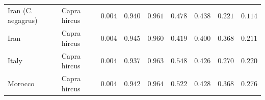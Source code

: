 \documentclass{article}
\providecommand{\DIFaddtex}[1]{{\protect\color{blue}\uwave{#1}}} %
\providecommand{\DIFdeltex}[1]{{\protect\color{red}\sout{#1}}}                      %
\providecommand{\DIFaddFL}[1]{\DIFadd{#1}} %
\providecommand{\DIFdelFL}[1]{\DIFdel{#1}} %
\providecommand{\DIFaddbeginFL}{} %
\providecommand{\DIFaddendFL}{} %
\providecommand{\DIFdelbeginFL}{} %
\providecommand{\DIFdelendFL}{} %
\providecommand{\DIFadd}[1]{\texorpdfstring{\DIFaddtex{#1}}{#1}} %
\providecommand{\DIFdel}[1]{\texorpdfstring{\DIFdeltex{#1}}{}} %
\newcommand{\DIFscaledelfig}{0.5}
\newlength{\DIFdelgraphicswidth} %
\newlength{\DIFdelgraphicsheight} %
\newcommand{\DIFaddincludegraphics}[2][]{{\color{blue}\fbox{\DIFOincludegraphics[#1]{#2}}}} %
\newcommand{\DIFdelincludegraphics}[2][]{%
\sbox{\DIFdelgraphicsbox}{\DIFOincludegraphics[#1]{#2}}%
\settoboxwidth{\DIFdelgraphicswidth}{\DIFdelgraphicsbox} %
\settoboxtotalheight{\DIFdelgraphicsheight}{\DIFdelgraphicsbox} %
\scalebox{\DIFscaledelfig}{%
\parbox[b]{\DIFdelgraphicswidth}{\usebox{\DIFdelgraphicsbox}\\[-\baselineskip] \rule{\DIFdelgraphicswidth}{0em}}\llap{\resizebox{\DIFdelgraphicswidth}{\DIFdelgraphicsheight}{%
\setlength{\unitlength}{\DIFdelgraphicswidth}%
\begin{picture}(1,1)%
\thicklines\linethickness{2pt} %
{\color[rgb]{1,0,0}\put(0,0){\framebox(1,1){}}}%
{\color[rgb]{1,0,0}\put(0,0){\line( 1,1){1}}}%
{\color[rgb]{1,0,0}\put(0,1){\line(1,-1){1}}}%
\end{picture}%
}\hspace*{3pt}}} %
} %
\DeclareRobustCommand{\DIFaddbeginFL}{\DIFOaddbeginFL \let\includegraphics\DIFaddincludegraphics} %
\DeclareRobustCommand{\DIFaddendFL}{\DIFOaddendFL \let\includegraphics\DIFOincludegraphics} %
\DeclareRobustCommand{\DIFdelbeginFL}{\DIFOdelbeginFL \let\includegraphics\DIFdelincludegraphics} %
\DeclareRobustCommand{\DIFdelendFL}{\DIFOaddendFL \let\includegraphics\DIFOincludegraphics} %
\begin{document}
\begin{table}[tb]
\begin{adjustbox}{width=\textwidth}
\begin{tabular}{||l|l|r||r|r||r|r||r|r||}
                \rowcolor{LIGHTGREY} Iran (C. aegagrus) & Capra hircus & \DIFdelbeginFL \DIFdelFL{$ 0.004$ }\DIFdelendFL \DIFaddbeginFL \DIFaddFL{$1.9\times 10^{5}$ }\DIFaddendFL & \DIFdelbeginFL \DIFdelFL{$ 0.940$ }\DIFdelendFL \DIFaddbeginFL \DIFaddFL{$ 0.948$ }\DIFaddendFL & \DIFdelbeginFL \DIFdelFL{$ 0.961$ }\DIFdelendFL \DIFaddbeginFL \DIFaddFL{$ 0.969$ }\DIFaddendFL & \DIFdelbeginFL \DIFdelFL{$ 0.478$ }\DIFdelendFL \DIFaddbeginFL \DIFaddFL{$ 0.486$ }\DIFaddendFL & \DIFdelbeginFL \DIFdelFL{$ 0.438$ }\DIFdelendFL \DIFaddbeginFL \DIFaddFL{$ 0.444$ }\DIFaddendFL & \DIFdelbeginFL \DIFdelFL{$ 0.221$ }\DIFdelendFL \DIFaddbeginFL \DIFaddFL{$ 0.368$ }\DIFaddendFL & \DIFdelbeginFL \DIFdelFL{$ 0.114$ }\DIFdelendFL \DIFaddbeginFL \DIFaddFL{$ 0.165$ }\DIFaddendFL \\
                \rowcolor{LIGHTGREY} Iran & Capra hircus & \DIFdelbeginFL \DIFdelFL{$ 0.004$ }\DIFdelendFL \DIFaddbeginFL \DIFaddFL{$2.3\times 10^{5}$ }\DIFaddendFL & \DIFdelbeginFL \DIFdelFL{$ 0.945$ }\DIFdelendFL \DIFaddbeginFL \DIFaddFL{$ 0.953$ }\DIFaddendFL & \DIFdelbeginFL \DIFdelFL{$ 0.960$ }\DIFdelendFL \DIFaddbeginFL \DIFaddFL{$ 0.966$ }\DIFaddendFL & \DIFdelbeginFL \DIFdelFL{$ 0.419$ }\DIFdelendFL \DIFaddbeginFL \DIFaddFL{$ 0.425$ }\DIFaddendFL & \DIFdelbeginFL \DIFdelFL{$ 0.400$ }\DIFdelendFL \DIFaddbeginFL \DIFaddFL{$ 0.407$ }\DIFaddendFL & $ 0.368$ & \DIFdelbeginFL \DIFdelFL{$ 0.211$ }\DIFdelendFL \DIFaddbeginFL \DIFaddFL{$ 0.193$ }\DIFaddendFL \\
                \rowcolor{LIGHTGREY} Italy & Capra hircus & \DIFdelbeginFL \DIFdelFL{$ 0.004$ }\DIFdelendFL \DIFaddbeginFL \DIFaddFL{$1.9\times 10^{5}$ }\DIFaddendFL & \DIFdelbeginFL \DIFdelFL{$ 0.937$ }\DIFdelendFL \DIFaddbeginFL \DIFaddFL{$ 0.947$ }\DIFaddendFL & \DIFdelbeginFL \DIFdelFL{$ 0.963$ }\DIFdelendFL \DIFaddbeginFL \DIFaddFL{$ 0.971$ }\DIFaddendFL & \DIFdelbeginFL \DIFdelFL{$ 0.548$ }\DIFdelendFL \DIFaddbeginFL \DIFaddFL{$ 0.551$ }\DIFaddendFL & \DIFdelbeginFL \DIFdelFL{$ 0.426$ }\DIFdelendFL \DIFaddbeginFL \DIFaddFL{$ 0.439$ }\DIFaddendFL & \DIFdelbeginFL \DIFdelFL{$ 0.270$ }\DIFdelendFL \DIFaddbeginFL \DIFaddFL{$ 0.368$ }\DIFaddendFL & \DIFdelbeginFL \DIFdelFL{$ 0.220$ }\DIFdelendFL \DIFaddbeginFL \DIFaddFL{$ 0.243$ }\DIFaddendFL \\
                \rowcolor{LIGHTGREY} Morocco & Capra hircus & \DIFdelbeginFL \DIFdelFL{$ 0.004$ }\DIFdelendFL \DIFaddbeginFL \DIFaddFL{$2.2\times 10^{5}$ }\DIFaddendFL & \DIFdelbeginFL \DIFdelFL{$ 0.942$ }\DIFdelendFL \DIFaddbeginFL \DIFaddFL{$ 0.950$ }\DIFaddendFL & \DIFdelbeginFL \DIFdelFL{$ 0.964$ }\DIFdelendFL \DIFaddbeginFL \DIFaddFL{$ 0.970$ }\DIFaddendFL & \DIFdelbeginFL \DIFdelFL{$ 0.522$ }\DIFdelendFL \DIFaddbeginFL \DIFaddFL{$ 0.527$ }\DIFaddendFL & \DIFdelbeginFL \DIFdelFL{$ 0.428$ }\DIFdelendFL \DIFaddbeginFL \DIFaddFL{$ 0.440$ }\DIFaddendFL & $ 0.368$ & \DIFdelbeginFL \DIFdelFL{$ 0.276$ }\DIFdelendFL \DIFaddbeginFL \DIFaddFL{$ 0.245$ }\DIFaddendFL \\

\end{tabular}
\end{adjustbox}
\end{table}
\end{document}
